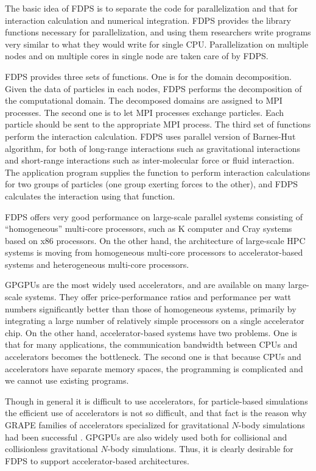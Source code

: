 \documentclass[dvipdfmx]{pasj01}
\begin{document}
The basic idea of FDPS is to separate the code for parallelization and
that for interaction calculation and numerical integration. FDPS
provides the library functions necessary for parallelization, and
using them researchers write programs very similar to what they would
write for single CPU. Parallelization on multiple nodes and on
multiple cores in single node are taken care of by FDPS.

FDPS provides three sets of functions. One is for the domain
decomposition. Given the data of particles in each nodes, FDPS
performs the decomposition of the computational domain. The decomposed
domains are assigned to MPI processes. The second one is to let MPI
processes exchange particles. Each particle should be sent to the
appropriate MPI process. The third set of functions perform the
interaction calculation. FDPS uses parallel version of Barnes-Hut
algorithm, for both of long-range interactions such as gravitational
interactions and short-range interactions such as inter-molecular
force or fluid interaction. The application program supplies the
function to perform interaction calculations for two groups of
particles (one group exerting forces to the other), and FDPS
calculates the interaction using that function.

FDPS offers very good performance on large-scale parallel systems
consisting of ``homogeneous'' multi-core processors, such as K
computer and Cray systems based on x86 processors. On the other hand,
the architecture of large-scale HPC systems is moving from homogeneous
multi-core processors to accelerator-based systems and heterogeneous
multi-core processors.

GPGPUs are the most widely used accelerators, and are available on
many large-scale systems. They offer price-performance ratios and
performance per watt numbers significantly better than those of
homogeneous systems, primarily by integrating a large number of
relatively simple processors on a single accelerator chip. On the
other hand, accelerator-based systems have two problems. One is that
for many applications, the communication bandwidth between CPUs and
accelerators becomes the bottleneck. The second one is that because
CPUs and accelerators have separate memory spaces, the programming is
complicated and we cannot use existing programs.

Though in general it is difficult to use accelerators, for
particle-based simulations the efficient use of accelerators is not so
difficult, and that fact is the reason why GRAPE families of
accelerators specialized for gravitational $N$-body simulations had
been successful \citep{2003PASJ...55.1163M}.  GPGPUs are also widely
used both for collisional \citep{2009NewA...14..630G} and
collisionless \citep{2012JCoPh.231.2825B} gravitational $N$-body
simulations. Thus, it is clearly desirable for FDPS to support
accelerator-based architectures.
\end{document}
